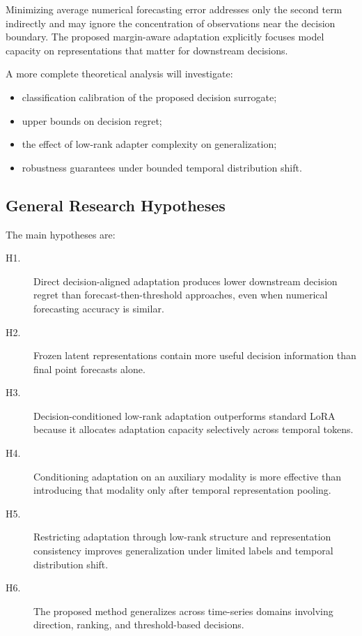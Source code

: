 \documentclass[11pt]{article}
\begin{document}
Minimizing average numerical forecasting error addresses only the second term
indirectly and may ignore the concentration of observations near the decision
boundary. The proposed margin-aware adaptation explicitly focuses model
capacity on representations that matter for downstream decisions.

A more complete theoretical analysis will investigate:

\begin{itemize}
    \item classification calibration of the proposed decision surrogate;
    \item upper bounds on decision regret;
    \item the effect of low-rank adapter complexity on generalization;
    \item robustness guarantees under bounded temporal distribution shift.
\end{itemize}

\subsection{General Research Hypotheses}

The main hypotheses are:

\begin{description}
    \item[H1.]
    Direct decision-aligned adaptation produces lower downstream decision
    regret than forecast-then-threshold approaches, even when numerical
    forecasting accuracy is similar.

    \item[H2.]
    Frozen latent representations contain more useful decision information
    than final point forecasts alone.

    \item[H3.]
    Decision-conditioned low-rank adaptation outperforms standard LoRA because
    it allocates adaptation capacity selectively across temporal tokens.

    \item[H4.]
    Conditioning adaptation on an auxiliary modality is more effective than
    introducing that modality only after temporal representation pooling.

    \item[H5.]
    Restricting adaptation through low-rank structure and representation
    consistency improves generalization under limited labels and temporal
    distribution shift.

    \item[H6.]
    The proposed method generalizes across time-series domains involving
    direction, ranking, and threshold-based decisions.
\end{description}
\end{document}
